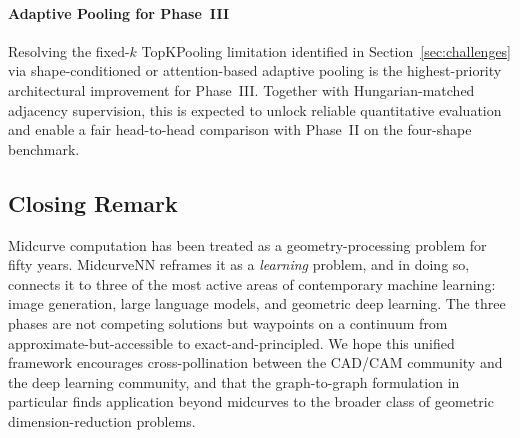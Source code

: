 \documentclass[journal]{IEEEtran}
\begin{document}
\paragraph{Adaptive Pooling for Phase~III}
Resolving the fixed-$k$ TopKPooling limitation identified in
Section~\ref{sec:challenges} via shape-conditioned or attention-based adaptive
pooling is the highest-priority architectural improvement for Phase~III.
Together with Hungarian-matched adjacency supervision, this is expected to
unlock reliable quantitative evaluation and enable a fair head-to-head
comparison with Phase~II on the four-shape benchmark.

\subsection{Closing Remark}

Midcurve computation has been treated as a geometry-processing problem for
fifty years.  MidcurveNN reframes it as a \emph{learning} problem, and in
doing so, connects it to three of the most active areas of contemporary machine
learning: image generation, large language models, and geometric deep learning.
The three phases are not competing solutions but waypoints on a continuum from
approximate-but-accessible to exact-and-principled.  We hope this unified
framework encourages cross-pollination between the CAD/CAM community and the
deep learning community, and that the graph-to-graph formulation in particular
finds application beyond midcurves to the broader class of geometric
dimension-reduction problems.



\end{document}
